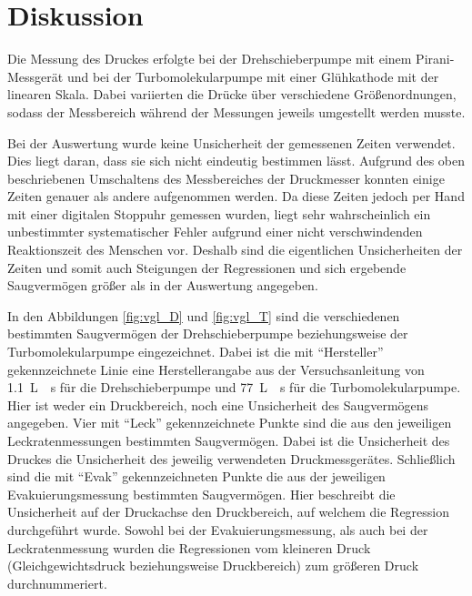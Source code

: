 \section{Diskussion}
\label{sec:Diskussion}

Die Messung des Druckes erfolgte bei der Drehschieberpumpe mit einem
Pirani-Messgerät und bei der Turbomolekularpumpe mit einer Glühkathode mit der
linearen Skala. Dabei variierten die Drücke über verschiedene Größenordnungen,
sodass der Messbereich während der Messungen jeweils umgestellt werden musste.

Bei der Auswertung wurde keine Unsicherheit der gemessenen Zeiten verwendet.
Dies liegt daran, dass sie sich nicht eindeutig bestimmen lässt.
Aufgrund des oben beschriebenen Umschaltens des Messbereiches der Druckmesser konnten
einige Zeiten genauer als andere aufgenommen werden.
Da diese Zeiten jedoch per Hand mit einer digitalen Stoppuhr gemessen wurden,
liegt sehr wahrscheinlich ein unbestimmter systematischer Fehler aufgrund einer
nicht verschwindenden Reaktionszeit des Menschen vor.
Deshalb sind die eigentlichen Unsicherheiten der Zeiten und somit auch
Steigungen der Regressionen und sich ergebende Saugvermögen größer als
in der Auswertung angegeben.

In den Abbildungen \ref{fig:vgl_D} und \ref{fig:vgl_T} sind die verschiedenen
bestimmten Saugvermögen der Drehschieberpumpe beziehungsweise der
Turbomolekularpumpe eingezeichnet.
Dabei ist die mit \enquote{Hersteller} gekennzeichnete Linie eine Herstellerangabe
aus der Versuchsanleitung \cite{anleitung} von \SI{1.1}{\liter{}\second}
für die Drehschieberpumpe und \SI{77}{\liter{}\second} für die
Turbomolekularpumpe. Hier ist weder ein Druckbereich, noch eine Unsicherheit des
Saugvermögens angegeben.
Vier mit \enquote{Leck} gekennzeichnete Punkte sind die aus den jeweiligen
Leckratenmessungen bestimmten Saugvermögen. Dabei ist die Unsicherheit des
Druckes die Unsicherheit des jeweilig verwendeten Druckmessgerätes.
Schließlich sind die mit \enquote{Evak} gekennzeichneten Punkte die aus der
jeweiligen Evakuierungsmessung bestimmten Saugvermögen. Hier beschreibt die
Unsicherheit auf der Druckachse den Druckbereich, auf welchem die Regression
durchgeführt wurde.
Sowohl bei der Evakuierungsmessung, als auch bei der Leckratenmessung wurden die
Regressionen vom kleineren Druck (Gleichgewichtsdruck beziehungsweise Druckbereich)
zum größeren Druck durchnummeriert.

